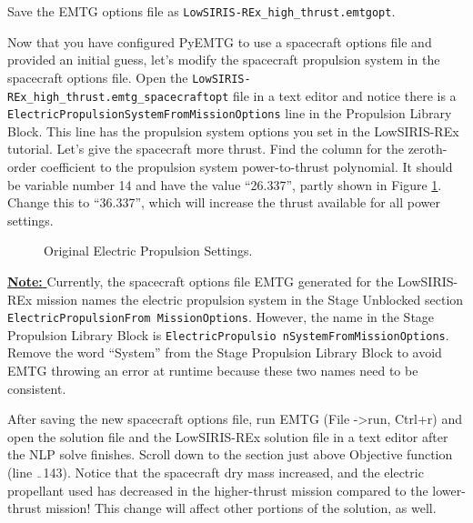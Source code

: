 \documentclass[11pt]{article}
\makeatletter
\newcommand{\knownissuelabel}[2]
{
	 \phantomsection
  	\hyperref[#2_h]{#1}\def\@currentlabel{\unexpanded{#1}}\label{#2_b}
}
\makeatother
\begin{document}
\noindent Save the \ac{EMTG} options file as \texttt{LowSIRIS-REx\_high\_thrust.emtgopt}.

\noindent Now that you have configured PyEMTG to use a spacecraft options file and provided an initial guess, let’s modify the spacecraft propulsion system in the spacecraft options file. Open the \texttt{LowSIRIS-REx\_high\_thrust.emtg\_spacecraftopt} file in a text editor and notice there is a \texttt{ElectricPropulsionSystemFromMissionOptions} line in the Propulsion Library Block. This line has the propulsion system options you set in the LowSIRIS-REx tutorial. Let’s give the spacecraft more thrust. Find the column for the zeroth-order coefficient to the propulsion system power-to-thrust polynomial. It should be variable number 14 and have the value ``26.337'', partly shown in Figure \ref{fig:zero_order_coefficient}. Change this to ``36.337'', which will increase the thrust available for all power settings.

\begin{figure}[H]
	\centering
	\caption{\label{fig:zero_order_coefficient}Original Electric Propulsion Settings.}
\end{figure}

\noindent \knownissuelabel{\textbf{Note: }}{elec_prop_system_name_issue} Currently, the spacecraft options file \ac{EMTG} generated for the LowSIRIS-REx mission names the electric propulsion system in the Stage Unblocked section \texttt{ElectricPropulsionFrom MissionOptions}. However, the name in the Stage Propulsion Library Block is \texttt{ElectricPropulsio nSystemFromMissionOptions}. Remove the word ``System'' from the Stage Propulsion Library Block to avoid \ac{EMTG} throwing an error at runtime because these two names need to be consistent.

\noindent After saving the new spacecraft options file, run \ac{EMTG} (File -\textgreater run, Ctrl+r) and open the solution file and the LowSIRIS-REx solution file in a text editor after the \acs{NLP} solve finishes. Scroll down to the section just above Objective function (line \({}_{\textrm{\symbol{126}}}\)143). Notice that the spacecraft dry mass increased, and the electric propellant used has decreased in the higher-thrust mission compared to the lower-thrust mission! This change will affect other portions of the solution, as well.
\end{document}
